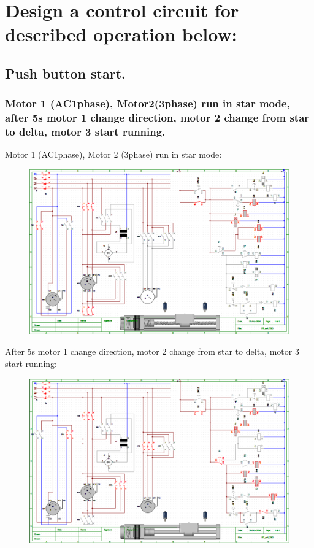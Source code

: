\section{Design a control circuit for described operation below:}
\subsection{Push button start.}
\subsubsection{Motor 1 (AC1phase), Motor2(3phase) run in star mode, after 5s motor 1 change direction, motor 2 change from star to delta, motor 3 start running.}
Motor 1 (AC1phase), Motor 2 (3phase) run in star mode:
\begin{figure}[H]
    \centering
    \includegraphics[width=1\textwidth]{pictures/1a.png}
\end{figure}
\cleardoublepage
After 5s motor 1 change direction, motor 2 change from star to delta, motor 3 start running:
\begin{figure}[H]
    \centering
    \includegraphics[width=1\textwidth]{pictures/1b.png}
\end{figure}
\cleardoublepage
